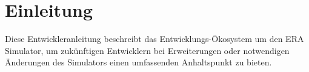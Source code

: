 
\section{Einleitung}

Diese Entwickleranleitung beschreibt das Entwicklungs-Ökosystem um den ERA Simulator, um zukünftigen Entwicklern bei Erweiterungen oder notwendigen Änderungen des Simulators einen umfassenden Anhaltspunkt zu bieten.
